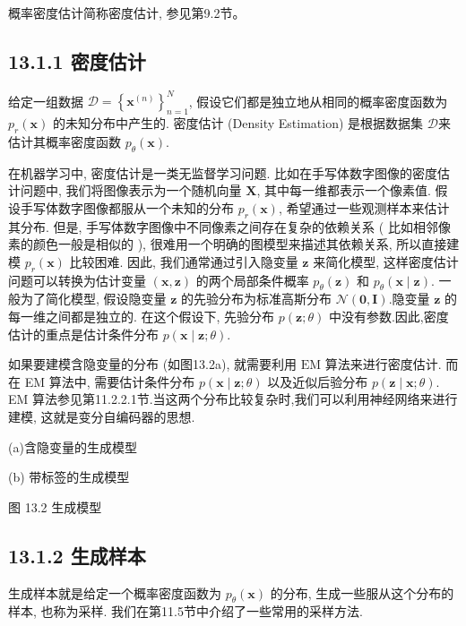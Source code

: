 \documentclass[10pt]{article}
\begin{document}
概率密度估计简称密度估计, 参见第9.2节。

\subsection*{13.1.1 密度估计}
给定一组数据 $\mathcal{D}=\left\{\boldsymbol{x}^{(n)}\right\}_{n=1}^{N}$, 假设它们都是独立地从相同的概率密度函数为 $p_{r}(\boldsymbol{x})$ 的未知分布中产生的. 密度估计 (Density Estimation) 是根据数据集 $\mathcal{D}$来估计其概率密度函数 $p_{\theta}(\boldsymbol{x})$.

在机器学习中, 密度估计是一类无监督学习问题. 比如在手写体数字图像的密度估计问题中, 我们将图像表示为一个随机向量 $\boldsymbol{X}$, 其中每一维都表示一个像素值. 假设手写体数字图像都服从一个未知的分布 $p_{r}(\boldsymbol{x})$, 希望通过一些观测样本来估计其分布. 但是, 手写体数字图像中不同像素之间存在复杂的依赖关系 ( 比如相邻像素的颜色一般是相似的 ), 很难用一个明确的图模型来描述其依赖关系, 所以直接建模 $p_{r}(\boldsymbol{x})$ 比较困难. 因此, 我们通常通过引入隐变量 $\boldsymbol{z}$ 来简化模型, 这样密度估计问题可以转换为估计变量 $(\boldsymbol{x}, \boldsymbol{z})$ 的两个局部条件概率 $p_{\theta}(\boldsymbol{z})$ 和 $p_{\theta}(\boldsymbol{x} \mid \boldsymbol{z})$. 一般为了简化模型, 假设隐变量 $\boldsymbol{z}$ 的先验分布为标准高斯分布 $\mathcal{N}(\mathbf{0}, \boldsymbol{I})$.隐变量 $\boldsymbol{z}$ 的每一维之间都是独立的. 在这个假设下, 先验分布 $p(\boldsymbol{z} ; \theta)$ 中没有参数.因此,密度估计的重点是估计条件分布 $p(\boldsymbol{x} \mid \boldsymbol{z} ; \theta)$.

如果要建模含隐变量的分布 (如图13.2a), 就需要利用 $\mathrm{EM}$ 算法来进行密度估计. 而在 EM 算法中, 需要估计条件分布 $p(\boldsymbol{x} \mid \boldsymbol{z} ; \theta)$ 以及近似后验分布 $p(\boldsymbol{z} \mid \boldsymbol{x} ; \theta)$. EM 算法参见第11.2.2.1节.当这两个分布比较复杂时,我们可以利用神经网络来进行建模, 这就是变分自编码器的思想.



(a)含隐变量的生成模型



(b) 带标签的生成模型

图 13.2 生成模型

\subsection*{13.1.2 生成样本}
生成样本就是给定一个概率密度函数为 $p_{\theta}(\boldsymbol{x})$ 的分布, 生成一些服从这个分布的样本, 也称为采样. 我们在第11.5节中介绍了一些常用的采样方法.
\end{document}

